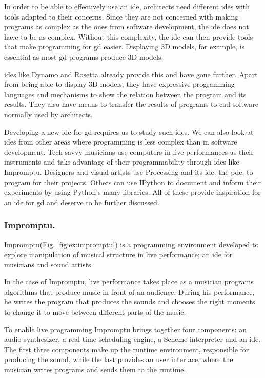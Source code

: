 \documentclass{./llncs2e/llncs}
\begin{document}
	In order to be able to effectively use an \ac{ide}, architects need different \acp{ide} with tools adapted to their concerns.
	Since they are not concerned with making programs as complex as the ones from software development, the \ac{ide} does not have to be as complex.
	Without this complexity, the \ac{ide} can then provide tools that make programming for \ac{gd} easier.
	Displaying 3D models, for example, is essential as most \ac{gd} programs produce 3D models.
	
	\ac{ide}s like Dynamo\cite{dynamo2015site} and Rosetta\cite{de2012modern} already provide this and have gone further.
	Apart from being able to display 3D models, they have expressive programming languages and mechanisms to show the relation between the program and its results.
	They also have means to transfer the results of programs to \ac{cad} software normally used by architects.
	
	Developing a new \ac{ide} for \ac{gd} requires us to study such \ac{ide}s.
	We can also look at \acp{ide} from other areas where programming is less complex than in software development.
	Tech savvy musicians use computers in live performances as their instruments and take advantage of their programmability through \ac{ide}s like Impromptu.
	Designers and visual artists use Processing and its \ac{ide}, the \ac{pde}, to program for their projects.
	Others can use IPython to document and inform their experiments by using Python's many libraries.
	All of these provide inspiration for an \ac{ide} for \ac{gd} and deserve to be further discussed.
	
\subsubsection{Impromptu.}
	Impromptu\cite{sorensen2005impromptu,sorensen2010programming}(Fig. \ref{fig:ex:impromptu}) is a programming environment developed to explore manipulation of musical structure in live performance; an \ac{ide} for musicians and sound artists.
	
	In the case of Impromptu, live performance takes place as a musician programs algorithms that produce music in front of an audience.
	During his performance, he writes the program that produces the sounds and chooses the right moments to change it to move between different parts of the music.
	
	To enable live programming Impromptu brings together four components: an audio synthesizer, a real-time scheduling engine, a Scheme interpreter and an \ac{ide}. 
	The first three components make up the runtime environment, responsible for producing the sound, while the last provides an user interface, where the musician writes programs and sends them to the runtime. 
	
\end{document}
